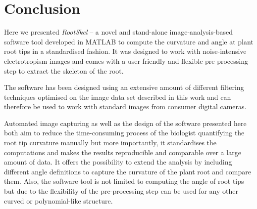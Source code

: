 
\chapter{Conclusion} %

\label{conclusion} %

%







Here we presented \textit{RootSkel} -- a novel and stand-alone image-analysis-based software tool developed in MATLAB to compute the curvature and angle at plant root tips in a standardised fashion. It was designed to work with noise-intensive electrotropism images and comes with a user-friendly and flexible pre-processing step to extract the skeleton of the root. %

The software has been designed using an extensive amount of different filtering techniques optimised on the image data set described in this work and can therefore be used to work with standard images from consumer digital cameras. 

Automated image capturing as well as the design of the software presented here both aim to reduce the time-consuming process of the biologist quantifying the root tip curvature manually but more importantly, it standardises the computations and makes the results reproducible and comparable over a large amount of data. It offers the possibility to extend the analysis by including different angle definitions to capture the curvature of the plant root and compare them. Also, the software tool is not limited to computing the angle of root tips but due to the flexibility of the pre-processing step can be used for any other curved or polynomial-like structure. 

